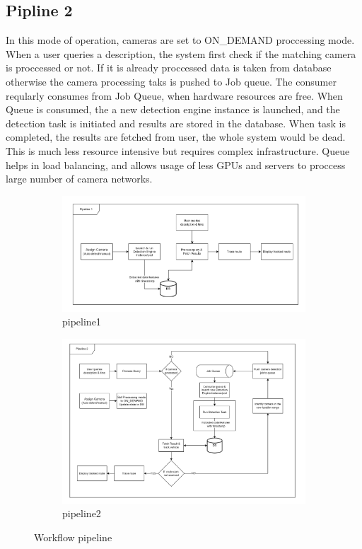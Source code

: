 \subsection*{Pipline 2}
In this mode of operation, cameras are set to ON_DEMAND proccessing mode. When a user queries a description, the system first check if the matching camera is proccessed or not. If it is already proccessed data is taken from database otherwise the camera processing taks is pushed to Job queue. The consumer reqularly consumes from Job Queue, when hardware resources are free. When Queue is consumed, the a new detection engine instance is launched, and the detection task is initiated and results are stored in the database. When task is completed, the results are fetched from user, the whole system would be dead.
This is much less resource intensive but requires complex infrastructure. Queue helps in load balancing, and allows usage of less GPUs and servers to proccess large number of camera networks.


\begin{figure}[h!]
	\centering
	\begin{subfigure}[b]{0.8\linewidth}
		\centering
		\includegraphics[width=\linewidth]{Images/pipeline1}
		\caption{pipeline1}
		\label{fig:pipeline1}
	\end{subfigure}

	\begin{subfigure}[b]{0.8\linewidth}
		\centering
		\includegraphics[width=\linewidth]{Images/pipeline2}
		\caption{pipeline2}
		\label{fig:pipeline2}
	\end{subfigure}
	\caption{Workflow pipeline}
\end{figure}

